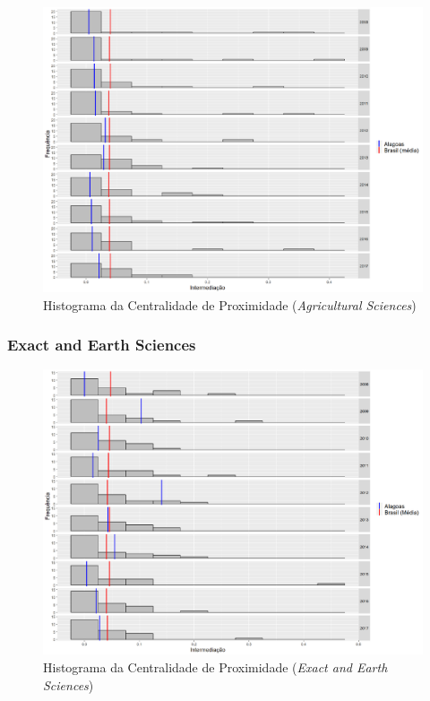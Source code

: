 \begin{figure}[H]
	\centering
	\includegraphics[scale=0.5]{Imagens/agricultural/betweeness-hist.pdf}
	\caption{Histograma da Centralidade de Proximidade (\textit{Agricultural Sciences})}
	\label{hist-agri-between-1}
\end{figure}

\subsubsection{Exact and Earth Sciences}

\begin{figure}[H]
	\centering
	\includegraphics[scale=0.5]{Imagens/exact/betweeness-hist.pdf}
	\caption{Histograma da Centralidade de Proximidade (\textit{Exact and Earth Sciences})}
    \label{hist-exact-between-1}
\end{figure}

